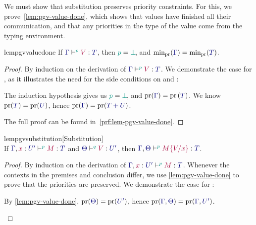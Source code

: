 \documentclass[main.tex]{subfiles}
\begin{document}
We must show that substitution preserves priority constraints. For this, we prove~\cref{lem:pgv-value-done}, which shows that values have finished all their communication, and that any priorities in the type of the value come from the typing environment.
\begin{compacttheorems}
  \begin{restatablelemma}{lempgvvaluedone}
    \label{lem:pgv-value-done}
    If $\tseq[\cs{p}]{\ty{\Gamma}}{V}{T}$, then $\cs{p}=\cs{\pbot}$, and $\minpr(\ty{\Gamma})=\minpr(\ty{T})$.
  \end{restatablelemma}
  \begin{proof}
    By induction on the derivation of $\tseq[\cs{p}]{\ty{\Gamma}}{V}{T}$. We demonstrate the case for , as it illustrates the need for the side conditions on  and :
    \begin{case*}
      The induction hypothesis gives us $\cs{p}=\cs{\pbot}$, and $\pr(\ty{\Gamma})=\pr{(\ty{T})}$. We know $\pr(\ty{T})=\pr({\ty{U}})$, hence $\pr(\ty{\Gamma})=\pr(\ty{\tysum{T}{U}})$.
      \begin{mathpar}
        \small
      \end{mathpar}
    \end{case*}
    The full proof can be found in~\cref{prf:lem-pgv-value-done}.
  \end{proof}
  \begin{restatablelemma}{lempgvsubstitution}[Substitution]
    \label{lem:pgv-substitution}
    \hfill\\%
    If $\tseq[\cs{p}]{\ty{\Gamma},\tmty{x}{U'}}{M}{T}$ and $\tseq[\cs{q}]{\ty{\Theta}}{V}{U'}$, then $\tseq[\cs{p}]{\ty{\Gamma},\ty{\Theta}}{\subst{M}{V}{x}}{T}$.
  \end{restatablelemma}
  \begin{proof}
    By induction on the derivation of $\tseq[\cs{p}]{\ty{\Gamma},\tmty{x}{U'}}{M}{T}$. Whenever the contexts in the premises and conclusion differ, we use \cref{lem:pgv-value-done} to prove that the priorities are preserved. We demonstrate the case for :
    \begin{case*}
      By \cref{lem:pgv-value-done}, $\pr(\ty{\Theta})=\pr(\ty{U'})$, hence $\pr(\ty{\Gamma},\ty{\Theta})=\pr(\ty{\Gamma},\ty{U'})$.

\end{case*}
\end{proof}
\end{compacttheorems}
\end{document}
